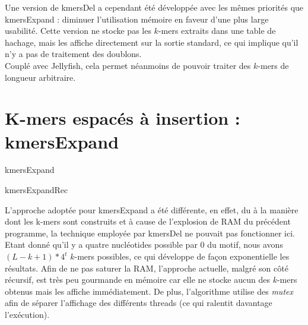 \documentclass{report}
\begin{document}
      Une version de kmersDel a cependant été développée avec les mêmes priorités que kmersExpand : diminuer l'utilisation mémoire en faveur d'une plus large usabilité. Cette version ne stocke pas les $k$-mers extraits dans une table de hachage, mais les affiche directement sur la sortie standard, ce qui implique qu'il n'y a pas de traitement des doublons.\\

      Couplé avec Jellyfish, cela permet néanmoins de pouvoir traiter des $k$-mers de longueur arbitraire.
    \section{K-mers espacés à insertion : kmersExpand}
      \normalsize
      \begin{algorithm}[H]{
        \caption{kmersExpand}
      }\end{algorithm}
      \begin{algorithm}[H]{
        \caption{kmersExpandRec}
      }\end{algorithm}\bigskip
      \large
      L'approche adoptée pour kmersExpand a été différente, en effet, du à la manière dont les k-mers sont construits et à cause de l'explosion de RAM du précédent programme, la technique employée par kmersDel ne pouvait pas fonctionner ici.\\

      Etant donné qu'il y a quatre nucléotides possible par $0$ du motif, nous avons $(L - k + 1)*4^t$ $k$-mers possibles, ce qui développe de façon exponentielle les résultats. Afin de ne pas saturer la RAM, l'approche actuelle, malgré son côté récursif, est très peu gourmande en mémoire car elle ne stocke aucun des $k$-mers obtenus mais les affiche immédiatement. De plus, l'algorithme utilise des \textit{mutex} afin de séparer l'affichage des différents threads (ce qui ralentit davantage l'exécution).\\
\end{document}
